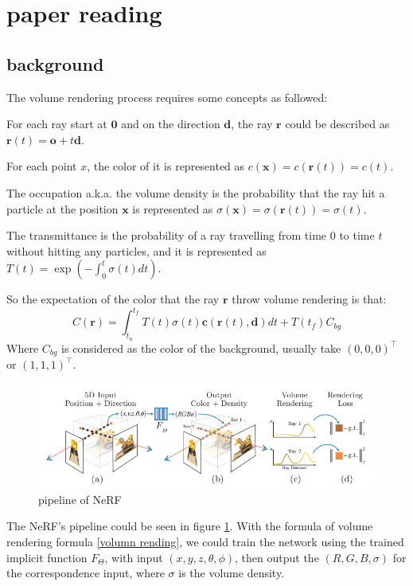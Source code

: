 \section{paper reading}
\subsection{background}

The volume rendering process requires some concepts as followed:

For each ray start at $\mathbf{0}$ and on the direction $\mathbf{d}$, the ray $\mathbf{r}$ could be described as $\mathbf{r}(t) = \mathbf{o} + t\mathbf{d}$.

For each point $x$, the color of it is represented as $c(\mathbf{x})=c(\mathbf{r}(t))=c(t)$.

The occupation a.k.a. the volume density is the probability that the ray hit a particle at the position $\mathbf{x}$ is represented as $\sigma(\mathbf{x})=\sigma(\mathbf{r}(t))=\sigma(t)$.

The transmittance is the probability of a ray travelling from time $0$ to time $t$ without hitting any particles, and it is represented as $T(t)=\exp(-\int_{0}^{t}\sigma(t)dt)$.

So the expectation of the color that the ray $\mathbf{r}$ throw volume rendering is that:
\begin{equation}
C(\mathbf{r}) = \int_{t_n}^{t_f} T(t)\sigma(t)\mathbf{c}(\mathbf{r}(t),\mathbf{d})dt + T(t_f)C_{bg}
\label{volumn rending}
\end{equation}
Where $C_{bg}$ is considered as the color of the background, usually take $(0,0,0)^{\top}$ or $(1,1,1)^{\top}$.

\begin{figure}[htbp]
\centering
\includegraphics[width=0.9\linewidth]{img/NeRF.png}
\caption{pipeline of NeRF}
\label{NeRF pipeline}
\end{figure}

The NeRF's pipeline could be seen in figure \ref{NeRF pipeline}. With the formula of volume rendering formula \ref{volumn rending}, we could train the network using the trained implicit function $F_{\Theta}$, with input $(x,y,z,\theta,\phi)$, then output the $(R,G,B,\sigma)$ for the correspondence input, where $\sigma$ is the volume density.

